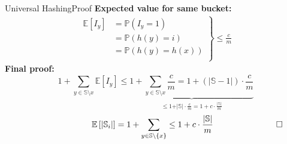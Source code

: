 \begin{frame}{Universal Hashing}{Proof}
  \textbf{Expected value for same bucket:}
  \begin{align*}
    \left.\begin{array}{rl}
      \mathbb{E}[I_y] & = \mathbb{P}(I_y = 1)\\
      {} & = \mathbb{P}(h(y) = i)\\
      {} & = \mathbb{P}(h(y) = h(x))\\
    \end{array}\right\rbrace
    \leq \frac{c}{m}
  \end{align*}
  \textbf{Final proof:}
  \begin{displaymath}
    1 + \sum_{y \in \mathbb{S} \setminus x} \mathbb{E}[I_y]
    \leq
    \underbrace{
      1 + \sum_{y \in \mathbb{S} \setminus x} \frac{c}{m}
        = 1 + \left(\vert \mathbb{S} - 1 \vert \right) \cdot \frac{c}{m}
    }_{
      \displaystyle \leq 1 + \vert \mathbb{S} \vert \cdot \frac{c}{m}
        = 1 + c \cdot \frac{\vert \mathbb{S} \vert}{m}
    }
  \end{displaymath}
  \begin{displaymath}
    \hspace*{7.5em}
    \mathbb{E}\left[\vert \mathbb{S}_i \vert\right]
      = 1 + \sum_{y \in \mathbb{S} \setminus \{x\}}
      \leq 1 + c \cdot \frac{\vert \mathbb{S} \vert}{m}
    \hspace*{7.5em}\square
  \end{displaymath}
\end{frame}